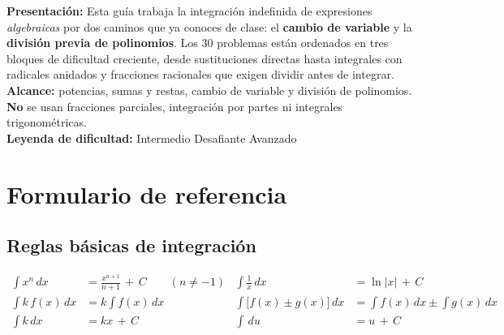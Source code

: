 \documentclass[12pt, letterpaper]{article}
\newcommand{\dx}{\,dx}
\newcommand{\du}{\,du}
\newcommand{\CC}{\,+\,C}
\begin{document}


\vspace{4pt}
\begin{cuadroinfo}
\small
\textbf{Presentación:} Esta guía trabaja la integración indefinida de expresiones
\emph{algebraicas} por dos caminos que ya conoces de clase: el \textbf{cambio de
variable} y la \textbf{división previa de polinomios}. Los 30 problemas están
ordenados en tres bloques de dificultad creciente, desde sustituciones directas
hasta integrales con radicales anidados y fracciones racionales que exigen
dividir antes de integrar.
\\[4pt]
\textbf{Alcance:} potencias, sumas y restas, cambio de variable y división de
polinomios. \textbf{No} se usan fracciones parciales, integración por partes ni
integrales trigonométricas.
\\[4pt]
\textbf{Leyenda de dificultad:}\quad
\medio{} Intermedio \quad
\dificil{} Desafiante \quad
\muyDificil{} Avanzado
\end{cuadroinfo}

\vspace{8pt}

\section{Formulario de referencia}

\subsection{Reglas básicas de integración}

\begin{cuadroteoria}
\begin{align*}
  \int x^{n}\dx &= \frac{x^{n+1}}{n+1} \CC \qquad (n \neq -1) &
  \int \frac{1}{x}\dx &= \ln|x| \CC \\[6pt]
  \int k\,f(x)\dx &= k\int f(x)\dx &
  \int \bigl[f(x) \pm g(x)\bigr]\dx &= \int f(x)\dx \pm \int g(x)\dx \\[6pt]
  \int k\dx &= kx \CC & \int \du &= u \CC
\end{align*}
\end{cuadroteoria}
\end{document}
